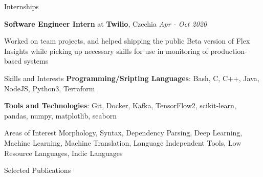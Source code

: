 \documentclass{resume} %
\begin{document}

\begin{rSection}{Internships}

    {\textbf{Software Engineer Intern} at \textbf{Twilio}, Czechia} 
        \hfill {\textit{Apr - Oct 2020}}
        
    Worked on team projects, and helped shipping the public Beta version of Flex Insights while picking up necessary skills for use in monitoring of production-based systems

\end{rSection}


\begin{rSection}{Skills and Interests}
    {\textbf{Programming/Sripting Languages}: Bash, C, C++, Java, NodeJS, Python3, Terraform}
    
    {\textbf{Tools and Technologies}: Git, Docker, Kafka, TensorFlow2, scikit-learn, pandas, numpy, matplotlib, seaborn}
    
    \begin{rSubsection}{Areas of Interest}{}{}{}
        Morphology, Syntax, Dependency Parsing, Deep Learning, Machine Learning, Machine Translation, Language Independent Tools, Low Resource Languages, Indic Languages
    \end{rSubsection}
\end{rSection}


\begin{rSection}{Selected Publications}

    {}
    
    {}
    
    {}
    
    {}
    
    {}

\end{rSection}
\end{document}
